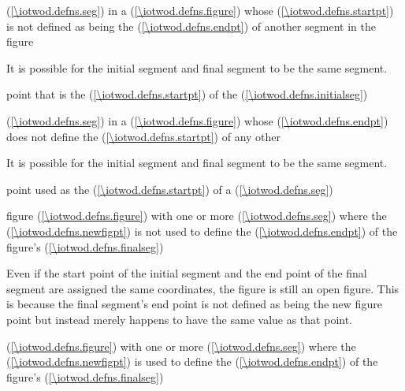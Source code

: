 %
 (\ref{\iotwod.defns.seg}) in a  (\ref{\iotwod.defns.figure}) whose  (\ref{\iotwod.defns.startpt}) is not defined as being the  (\ref{\iotwod.defns.endpt}) of another segment in the figure
\begin{note}
It is possible for the initial segment and final segment to be the same segment.
\end{note}

%
point that is the  (\ref{\iotwod.defns.startpt}) of the  (\ref{\iotwod.defns.initialseg})

%
 (\ref{\iotwod.defns.seg}) in a  (\ref{\iotwod.defns.figure}) whose  (\ref{\iotwod.defns.endpt}) does not define the  (\ref{\iotwod.defns.startpt}) of any other 
\begin{note}
It is possible for the initial segment and final segment to be the same segment.
\end{note}

%
point used as the  (\ref{\iotwod.defns.startpt}) of a  (\ref{\iotwod.defns.seg})

%
figure (\ref{\iotwod.defns.figure}) with one or more  (\ref{\iotwod.defns.seg}) where the  (\ref{\iotwod.defns.newfigpt}) is not used to define the  (\ref{\iotwod.defns.endpt}) of the figure's  (\ref{\iotwod.defns.finalseg})
\begin{note}
Even if the start point of the initial segment and the end point of the final segment are assigned the same coordinates, the figure is still an open figure. This is because the final segment's end point is not defined as being the new figure point but instead merely happens to have the same value as that point.
\end{note}

%
 (\ref{\iotwod.defns.figure}) with one or more  (\ref{\iotwod.defns.seg}) where the  (\ref{\iotwod.defns.newfigpt}) is used to define the  (\ref{\iotwod.defns.endpt}) of the figure's  (\ref{\iotwod.defns.finalseg})

